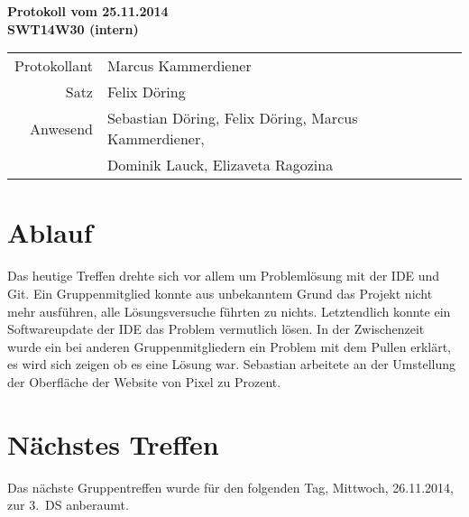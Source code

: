 \documentclass{scrartcl}
\begin{document}
\begin{center}
\LARGE \bf{Protokoll vom 25.11.2014 \\
SWT14W30 (intern)}
\end{center}

\begin{tabular}{rp{10cm}}
Protokollant & Marcus Kammerdiener \\
Satz & Felix Döring \\
Anwesend & Sebastian Döring, Felix Döring, Marcus Kammerdiener,\\
& Dominik Lauck, Elizaveta Ragozina \\
\end{tabular}

\vspace*{3em}

\section{Ablauf}
Das heutige Treffen drehte sich vor allem um Problemlösung mit der IDE und Git. Ein Gruppenmitglied konnte aus
unbekanntem Grund das Projekt nicht mehr ausführen, alle Lösungsversuche führten zu nichts. Letztendlich konnte
ein Softwareupdate der IDE das Problem vermutlich lösen. In der Zwischenzeit wurde ein bei anderen Gruppenmitgliedern
ein Problem mit dem Pullen erklärt, es wird sich zeigen ob es eine Lösung war.
Sebastian arbeitete an der Umstellung der Oberfläche der Website von Pixel zu Prozent.
\section{N\"achstes Treffen}
Das nächste Gruppentreffen wurde für den folgenden Tag, Mittwoch, 26.11.2014, zur 3.~DS anberaumt.
\end{document}
